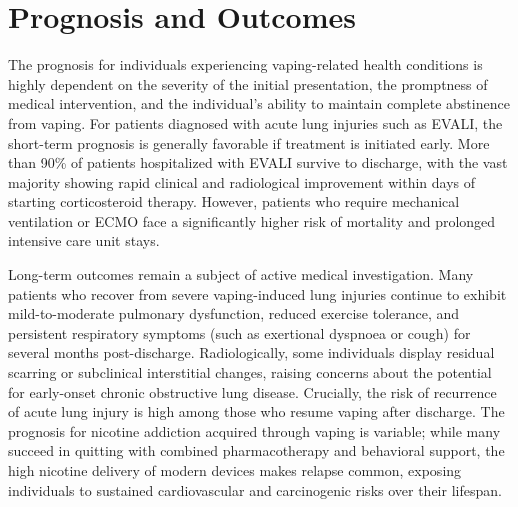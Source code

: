\section*{Prognosis and Outcomes}
The prognosis for individuals experiencing vaping-related health conditions is highly dependent on the severity of the initial presentation, the promptness of medical intervention, and the individual's ability to maintain complete abstinence from vaping. For patients diagnosed with acute lung injuries such as EVALI, the short-term prognosis is generally favorable if treatment is initiated early. More than 90\% of patients hospitalized with EVALI survive to discharge, with the vast majority showing rapid clinical and radiological improvement within days of starting corticosteroid therapy. However, patients who require mechanical ventilation or ECMO face a significantly higher risk of mortality and prolonged intensive care unit stays.

Long-term outcomes remain a subject of active medical investigation. Many patients who recover from severe vaping-induced lung injuries continue to exhibit mild-to-moderate pulmonary dysfunction, reduced exercise tolerance, and persistent respiratory symptoms (such as exertional dyspnoea or cough) for several months post-discharge. Radiologically, some individuals display residual scarring or subclinical interstitial changes, raising concerns about the potential for early-onset chronic obstructive lung disease. Crucially, the risk of recurrence of acute lung injury is high among those who resume vaping after discharge. The prognosis for nicotine addiction acquired through vaping is variable; while many succeed in quitting with combined pharmacotherapy and behavioral support, the high nicotine delivery of modern devices makes relapse common, exposing individuals to sustained cardiovascular and carcinogenic risks over their lifespan.

